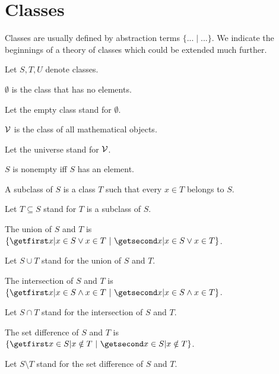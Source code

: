 \documentclass{article}
\begin{document}
\section{Classes}

Classes are usually defined by
abstraction terms $\{ ... \mid ... \}$. We indicate the
beginnings of a theory of classes which could be extended
much further.

\begin{forthel}
Let $S, T, U$ denote classes.

\begin{definition}
$\emptyset$ is the class that has no elements.
\end{definition}

Let the empty class stand for $\emptyset$.

\begin{definition}
${\cal V}$ is the class of all mathematical objects.
\end{definition}

Let the universe stand for ${\cal V}$.



\begin{definition}
$S$ is nonempty iff $S$ has an element.
\end{definition}

  \begin{definition}
    A subclass of $S$ is a class $T$ such that every $x \in T$ belongs to $S$.
  \end{definition}

  Let $T \subseteq S$ stand for $T$ is a subclass of $S$.

  \begin{definition}
    The union of $S$ and $T$ is $\class{x | x \in S \vee x \in T}$.
  \end{definition}

  Let $S \cup T$ stand for the union of $S$ and $T$.

  \begin{definition}
    The intersection of $S$ and $T$ is
      $\class{x | x \in S \wedge x \in T}$.
  \end{definition}

  Let $S \cap T$ stand for the intersection of $S$ and $T$.

  \begin{definition}
    The set difference of $S$ and $T$ is $\class{x \in S | x \notin T}$.
  \end{definition}

  Let $S \setminus T$ stand for the set difference of $S$ and $T$.
\end{forthel}
\end{document}
